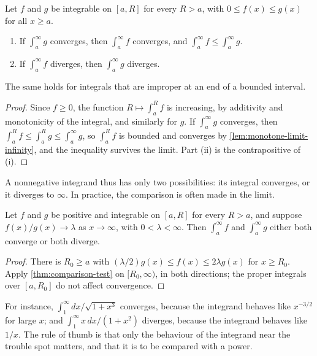 \begin{theorem}
\label{thm:comparison-test}
Let $f$ and $g$ be integrable on $[a,R]$ for every $R>a$, with $0\le f(x)\le g(x)$ for all $x\ge a$.
\begin{enumerate}
\item If $\int_a^\infty g$ converges, then $\int_a^\infty f$ converges, and $\int_a^\infty f\le\int_a^\infty g$.
\item If $\int_a^\infty f$ diverges, then $\int_a^\infty g$ diverges.
\end{enumerate}
The same holds for integrals that are improper at an end of a bounded interval.
\end{theorem}

\begin{proof}
Since $f\ge0$, the function $R\mapsto\int_a^Rf$ is increasing, by additivity and monotonicity of the integral, and similarly for $g$. If $\int_a^\infty g$ converges, then $\int_a^Rf\le\int_a^Rg\le\int_a^\infty g$, so $\int_a^Rf$ is bounded and converges by \cref{lem:monotone-limit-infinity}, and the inequality survives the limit. Part (ii) is the contrapositive of (i).
\end{proof}

A nonnegative integrand thus has only two possibilities: its integral converges, or it diverges to $\infty$. In practice, the comparison is often made in the limit.

\begin{corollary}
\label{cor:limit-comparison}
Let $f$ and $g$ be positive and integrable on $[a,R]$ for every $R>a$, and suppose $f(x)/g(x)\to\lambda$ as $x\to\infty$, with $0<\lambda<\infty$. Then $\int_a^\infty f$ and $\int_a^\infty g$ either both converge or both diverge.
\end{corollary}

\begin{proof}
There is $R_0\ge a$ with $(\lambda/2)g(x)\le f(x)\le2\lambda g(x)$ for $x\ge R_0$. Apply \cref{thm:comparison-test} on $[R_0,\infty)$, in both directions; the proper integrals over $[a,R_0]$ do not affect convergence.
\end{proof}

For instance, $\int_1^\infty dx/\sqrt{1+x^3}$ converges, because the integrand behaves like $x^{-3/2}$ for large $x$; and $\int_1^\infty x\,dx/(1+x^2)$ diverges, because the integrand behaves like $1/x$. The rule of thumb is that only the behaviour of the integrand near the trouble spot matters, and that it is to be compared with a power.

